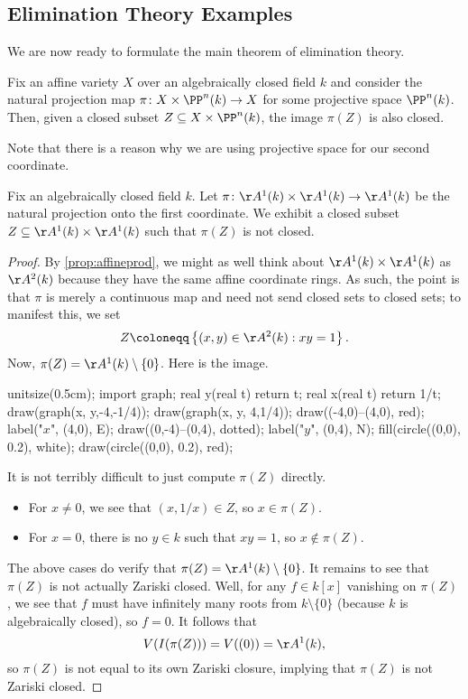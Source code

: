 \subsection{Elimination Theory Examples}
We are now ready to formulate the main theorem of elimination theory.
\begin{theorem} \label{thm:elim}
	Fix an affine variety $X$ over an algebraically closed field $k$ and consider the natural projection map $\pi\colon X\times\PP^n(k)\to X$ for some projective space $\PP^n(k)$. Then, given a closed subset $Z\subseteq X\times\PP^n(k)$, the image $\pi (Z)$ is also closed.
\end{theorem}
Note that there is a reason why we are using projective space for our second coordinate.
\begin{exe} \label{exe:elimnex}
	Fix an algebraically closed field $k$. Let $\pi\colon\AA^1(k)\times\AA^1(k)\to\AA^1(k)$ be the natural projection onto the first coordinate. We exhibit a closed subset $Z\subseteq\AA^1(k)\times\AA^1(k)$ such that $\pi(Z)$ is not closed.
\end{exe}
\begin{proof}
	By \autoref{prop:affineprod}, we might as well think about $\AA^1(k)\times\AA^1(k)$ as $\AA^2(k)$ because they have the same affine coordinate rings. As such, the point is that $\pi$ is merely a continuous map and need not send closed sets to closed sets; to manifest this, we set
	\[Z\coloneqq\left\{(x,y)\in\AA^2(k):xy=1\right\}.\]
	Now, $\pi(Z)=\AA^1(k)\setminus\{0\}$. Here is the image.
	\begin{center}
		\begin{asy}
			unitsize(0.5cm);
			import graph;
			real y(real t)
			{
				return t;
			}
			real x(real t)
			{
				return 1/t;
			}
			draw(graph(x, y,-4,-1/4));
			draw(graph(x, y, 4,1/4));
			draw((-4,0)--(4,0), red); label("$x$", (4,0), E);
			draw((0,-4)--(0,4), dotted); label("$y$", (0,4), N);
			fill(circle((0,0), 0.2), white);
			draw(circle((0,0), 0.2), red);
		\end{asy}
	\end{center}
	It is not terribly difficult to just compute $\pi\left(Z\right)$ directly.
	\begin{itemize}
		\item For $x\ne0$, we see that $(x,1/x)\in Z$, so $x\in\pi(Z)$.
		\item For $x=0$, there is no $y\in k$ such that $xy=1$, so $x\notin\pi(Z)$.
	\end{itemize}
	The above cases do verify that $\pi(Z)=\AA^1(k)\setminus\{0\}$. It remains to see that $\pi(Z)$ is not actually Zariski closed. Well, for any $f\in k[x]$ vanishing on $\pi(Z)$, we see that $f$ must have infinitely many roots from $k\setminus\{0\}$ (because $k$ is algebraically closed), so $f=0$. It follows that
	\[V(I(\pi(Z)))=V((0))=\AA^1(k),\]
	so $\pi(Z)$ is not equal to its own Zariski closure, implying that $\pi(Z)$ is not Zariski closed.
\end{proof}
